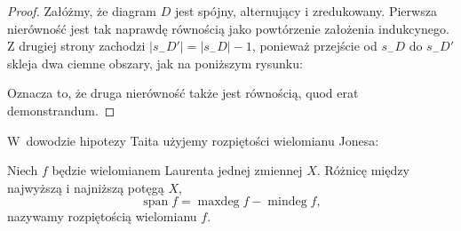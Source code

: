 \begin{proof}
    Załóżmy, że diagram $D$ jest spójny, alternujący i zredukowany.
    Pierwsza nierówność jest tak naprawdę równością jako powtórzenie założenia indukcynego.
    Z drugiej strony zachodzi $|s_-D'|=|s_-D|-1$, ponieważ przejście od $s_-D$ do $s_-D'$ skleja dwa ciemne obszary, jak na poniższym rysunku:
\begin{comment}
    \[
        \begin{tikzpicture}[baseline=-0.65ex,scale=0.20]
        \begin{knot}[clip width=5]
            \strand[thick] (-5, 0) to (5, 0);
            \strand[thick] (0, -5) to (0, 5);
            \draw[fill=diagramfiller,draw=none] (-5, -5) rectangle (0, 0);
            \draw[fill=diagramfiller,draw=none] ( 5,  5) rectangle (0, 0);
            \node at (0, -8) {$D$};
        \end{knot}
        \end{tikzpicture}
        \quad
        \begin{tikzpicture}[baseline=-0.65ex,scale=0.20]
            \draw[fill=diagramfiller, draw=none] (-5, 0) -- (-2, 0) [in=up, out=right] to (0, -2) -- (0, -5) -- (-5, -5);
            \draw[fill=diagramfiller, draw=none] (5, 0) -- (2, 0) [in=down, out=left] to (0, 2) -- (0, 5) -- (5, 5);
            \draw[thick] (-5, 0) -- (-2, 0) [in=up, out=right] to (0, -2) -- (0, -5);
            \draw[thick] (5, 0) -- (2, 0) [in=down, out=left] to (0, 2) -- (0, 5);
            \node at (0, -8) {$s_-D$};
        \end{tikzpicture}
        \quad
        \begin{tikzpicture}[baseline=-0.65ex,scale=0.20]
            \draw[fill=diagramfiller, draw=none] (-5, -5) rectangle (5, 5);
            \draw[fill=white, draw=none] (5, 0) -- (2, 0) [in=up, out=left] to (0, -2) -- (0, -5) -- (5, -5);
            \draw[fill=white, draw=none] (-5, 0) -- (-2, 0) [in=down, out=right] to (0, 2) -- (0, 5) -- (-5, 5);
            \draw[thick] (5, 0) -- (2, 0) [in=up, out=left] to (0, -2) -- (0, -5);
            \draw[thick] (-5, 0) -- (-2, 0) [in=down, out=right] to (0, 2) -- (0, 5);
            \node at (0, -8) {$s_-D'$};
        \end{tikzpicture}
    \]
\end{comment}
    Oznacza to, że druga nierówność także jest równością, quod erat demonstrandum.
\end{proof}

W~dowodzie hipotezy Taita użyjemy rozpiętości wielomianu Jonesa:

\begin{definition}[rozpiętość]
%
    Niech $f$ będzie wielomianem Laurenta jednej zmiennej $X$.
    Różnicę między najwyższą i najniższą potęgą $X$,
    \begin{equation}
        \operatorname{span} f = \operatorname{maxdeg} f - \operatorname{mindeg} f,
    \end{equation}
    nazywamy rozpiętością wielomianu $f$.
\end{definition}

